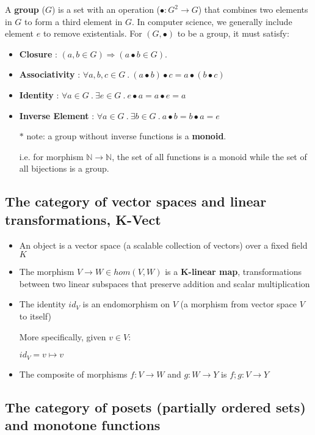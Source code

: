 \documentclass[../main.tex]{subfiles}
\begin{document}
A \textbf{group} ($G$) is a set with an operation ($\bullet : G^2 \rightarrow G$) that combines two elements in $G$ to form a third element in $G$. In computer science, we generally include element $e$ to remove existentials. For $(G,\bullet)$ to be a group, it must satisfy:
\begin{itemize}
  \item \textbf{Closure} : $(a , b \in G) \Rightarrow (a \bullet b \in G)$.
  \item \textbf{Associativity} : $\forall a,b,c \in G ~.~ (a \bullet b) \bullet c = a \bullet (b \bullet c)$
  \item \textbf{Identity} : $\forall a \in G ~.~ \exists e \in G ~.~ e \bullet a = a \bullet e = a$
  \item \textbf{Inverse Element} : $\forall a \in G ~.~ \exists b \in G ~.~ a \bullet b = b \bullet a = e$ \par
        $*$ note: a group without inverse functions is a \textbf{monoid}.

         i.e. for morphism $\mathbb{N} \rightarrow \mathbb{N}$, the set of all functions is a monoid while the set of all bijections is a group.
\end{itemize}

\subsection{The category of vector spaces and linear transformations, K-Vect}

\begin{itemize}
  \item An object is a vector space (a scalable collection of vectors) over a fixed field $K$
  \item The morphism $V \rightarrow W \in hom(V,W)$ is a \textbf{K-linear map}, transformations between two linear subspaces that preserve addition and scalar multiplication
  \item The identity $id_V$ is an endomorphism on $V$ (a morphism from vector space $V$ to itself)

    More specifically, given $v \in V$:

    $id_V = v \mapsto v$

  \item The composite of morphisms $f : V \rightarrow W$ and $g : W \rightarrow Y$ is $f ; g : V \rightarrow Y$
\end{itemize}


\subsection{The category of posets (partially ordered sets) and monotone functions}
\end{document}
